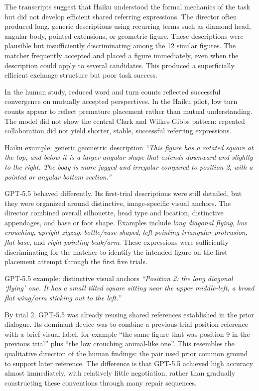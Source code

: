\documentclass[11pt]{article}
\begin{document}
The transcripts suggest that Haiku understood the formal mechanics of the task but did not develop efficient shared referring expressions. The director often produced long, generic descriptions using recurring terms such as diamond head, angular body, pointed extensions, or geometric figure. These descriptions were plausible but insufficiently discriminating among the 12 similar figures. The matcher frequently accepted and placed a figure immediately, even when the description could apply to several candidates. This produced a superficially efficient exchange structure but poor task success.

In the human study, reduced word and turn counts reflected successful convergence on mutually accepted perspectives. In the Haiku pilot, low turn counts appear to reflect premature placement rather than mutual understanding. The model did not show the central Clark and Wilkes-Gibbs pattern: repeated collaboration did not yield shorter, stable, successful referring expressions.

\begin{modelquote}{Haiku example: generic geometric description}
\emph{``This figure has a rotated square at the top, and below it is a larger angular shape that extends downward and slightly to the right. The body is more jagged and irregular compared to position 2, with a pointed or angular bottom section.''}
\end{modelquote}

GPT-5.5 behaved differently. Its first-trial descriptions were still detailed, but they were organized around distinctive, image-specific visual anchors. The director combined overall silhouette, head type and location, distinctive appendages, and base or foot shape. Examples include \emph{long diagonal flying}, \emph{low crouching}, \emph{upright zigzag}, \emph{bottle/vase-shaped}, \emph{left-pointing triangular protrusion}, \emph{flat base}, and \emph{right-pointing beak/arm}. These expressions were sufficiently discriminating for the matcher to identify the intended figure on the first placement attempt through the first five trials.

\begin{modelquote}{GPT-5.5 example: distinctive visual anchors}
\emph{``Position 2: the long diagonal `flying' one. It has a small tilted square sitting near the upper middle-left, a broad flat wing/arm sticking out to the left.''}
\end{modelquote}

By trial 2, GPT-5.5 was already reusing shared references established in the prior dialogue. Its dominant device was to combine a previous-trial position reference with a brief visual label, for example ``the same figure that was position 9 in the previous trial'' plus ``the low crouching animal-like one''. This resembles the qualitative direction of the human findings: the pair used prior common ground to support later reference. The difference is that GPT-5.5 achieved high accuracy almost immediately, with relatively little negotiation, rather than gradually constructing these conventions through many repair sequences.
\end{document}
